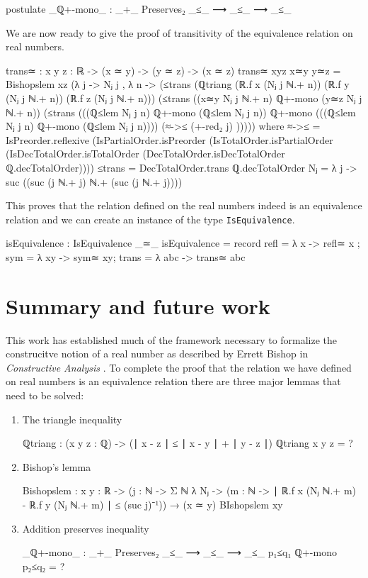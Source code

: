 \documentclass[11pt,a4paper]{article}
\begin{document}
\begin{code}
postulate _ℚ+-mono_ :  _+_ Preserves₂ _≤_ ⟶ _≤_ ⟶ _≤_
\end{code}
We are now ready to give the proof of transitivity of the equivalence relation on real numbers.
\begin{code}
trans≃ : {x y z : ℝ} -> (x ≃ y) -> (y ≃ z) -> (x ≃ z)
trans≃ {x}{y}{z} x≃y y≃z = Bishopslem {x}{z} (λ {j} -> 
  Nⱼ {j} , λ {n} -> (≤trans 
    (ℚtriang (ℝ.f x (Nⱼ {j} ℕ.+ n)) (ℝ.f y (Nⱼ {j} ℕ.+ n)) (ℝ.f z (Nⱼ {j} ℕ.+ n))) 
    (≤trans 
      ((x≃y {Nⱼ {j} ℕ.+ n}) ℚ+-mono (y≃z {Nⱼ {j} ℕ.+ n})) 
      (≤trans 
        (((ℚ≤lem {Nⱼ {j}} {n}) ℚ+-mono (ℚ≤lem {Nⱼ {j}} {n})) ℚ+-mono (((ℚ≤lem {Nⱼ {j}} {n}) ℚ+-mono (ℚ≤lem {Nⱼ {j}} {n}))))
        (≈->≤ (+-red₂ j) )))))
  where
    ≈->≤ = IsPreorder.reflexive (IsPartialOrder.isPreorder (IsTotalOrder.isPartialOrder (IsDecTotalOrder.isTotalOrder (DecTotalOrder.isDecTotalOrder ℚ.decTotalOrder))))
    ≤trans = DecTotalOrder.trans  ℚ.decTotalOrder
    Nⱼ = λ {j} -> suc ((suc (j ℕ.+ j) ℕ.+ (suc (j ℕ.+ j))))
\end{code}
This proves that the relation defined on the real numbers indeed is an equivalence relation and we can create an instance of the type \texttt{IsEquivalence}.
\begin{code}
isEquivalence : IsEquivalence _≃_
isEquivalence = record {
  refl = λ {x} -> refl≃ {x} ;
  sym = λ {x}{y} -> sym≃ {x}{y};
  trans = λ {a}{b}{c} -> trans≃ {a}{b}{c}
  }
\end{code}
\section{Summary and future work}
This work has established much of the framework necessary to formalize the construcitve notion of a real number as described by Errett Bishop in \textit{Constructive Analysis} \cite{bishop:85}. To complete the proof that the relation we have defined on real numbers is an equivalence relation there are three major lemmas that need to be solved:
\begin{enumerate}
\item The triangle inequality
\begin{code}
ℚtriang : (x y z : ℚ) -> (∣ x - z ∣ ≤ ∣ x - y ∣ + ∣ y - z ∣)
ℚtriang x y z = ?
\end{code}
\item Bishop's lemma
\begin{code}
Bishopslem : {x y : ℝ} -> ({j : ℕ} -> Σ ℕ λ Nⱼ -> ({m : ℕ} -> ∣ ℝ.f x (Nⱼ ℕ.+ m) - ℝ.f y (Nⱼ ℕ.+ m) ∣ ≤ (suc j)⁻¹)) → (x ≃ y)
BIshopslem {x}{y}
\end{code}
\item Addition preserves inequality
\begin{code}
_ℚ+-mono_ :  _+_ Preserves₂ _≤_ ⟶ _≤_ ⟶ _≤_
p₁≤q₁ ℚ+-mono p₂≤q₂ = ?
\end{code}
\end{enumerate}


\end{document}
